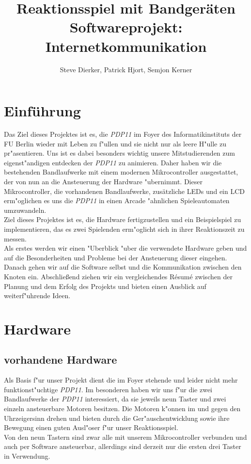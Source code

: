 \documentclass[a4paper]{article}
\title{%
  Reaktionsspiel mit Bandgeräten \\
  \large Softwareprojekt: Internetkommunikation}
\author{Steve Dierker, Patrick Hjort, Semjon Kerner}
\begin{document}
\maketitle

\section{Einführung}
  \label{sec:intro}
  Das Ziel dieses Projektes ist es, die \textit{PDP11} im Foyer des
  Informatikinstituts der FU Berlin wieder mit Leben zu f"ullen und sie nicht
  nur als leere H"ulle zu pr"asentieren. Uns ist es dabei besonders wichtig
  unsere Mitstudierenden zum eigenst"andigen entdecken der \textit{PDP11} zu
  animieren.  Daher haben wir die bestehenden Bandlaufwerke mit einem modernen
  Mikrocontroller ausgestattet, der von nun an die Ansteuerung der Hardware
  "ubernimmt.  Dieser Mikrocontroller, die vorhandenen Bandlaufwerke,
  zusätzliche LEDs und ein LCD erm"oglichen es uns die \textit{PDP11} in einen Arcade
  "ahnlichen Spieleautomaten umzuwandeln.\\ 
  Ziel dieses Projektes ist es, die Hardware fertigzustellen und ein
  Beispielspiel zu implementieren, das es zwei Spielenden erm"oglicht sich in
  ihrer Reaktionszeit zu messen.\\ Als erstes werden wir einen "Uberblick "uber
  die verwendete Hardware geben und auf die Besonderheiten und Probleme bei der
  Ansteuerung dieser eingehen.  Danach gehen wir auf die Software selbst und
  die Kommunikation zwischen den Knoten ein. Abschließend ziehen wir ein
  vergleichendes R\'{e}sum\'{e} zwischen der Planung und dem Erfolg des
  Projekts und bieten einen Ausblick auf weiterf"uhrende Ideen.

\section{Hardware}
  \label{sec:hardware}
  \subsection{vorhandene Hardware}
    \label{sec:hardware_existing}
    Als Basis f"ur unser Projekt dient die im Foyer stehende und leider nicht
    mehr funktionst"uchtige \textit{PDP11}. Im besonderen haben wir uns f"ur
    die zwei Bandlaufwerke der \textit{PDP11} interessiert, da sie jeweils neun
    Taster und zwei einzeln ansteuerbare Motoren besitzen. Die Motoren k"onnen
    im und gegen den Uhrzeigersinn drehen und bieten durch die
    Ger"auschentwicklung sowie ihre Bewegung einen guten Ausl"oser f"ur unser
    Reaktionsspiel.\\ Von den neun Tastern sind zwar alle mit unserem
    Mikrocontroller verbunden und auch per Software ansteuerbar, allerdings
    sind derzeit nur die ersten drei Taster in Verwendung.
\end{document}

